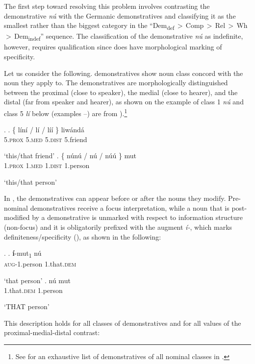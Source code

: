 The first step toward resolving this problem involves contrasting the demonstrative \textit{n\'u} with the Germanic demonstratives and classifying it as the smallest rather than the biggest category in the ``Dem\textsubscript{def}\,$>$\,Comp\,$>$\,Rel\,$>$\,Wh\,$>$\,Dem\textsubscript{indef}'' sequence. The classification of the demonstrative \textit{n\'u} as indefinite, however, requires qualification since  does have morphological marking of specificity.
\par
 Let us consider the following.  demonstratives show noun class concord with the noun they apply to. The demonstratives are morphologically distinguished between the proximal (close to speaker), the medial (close to hearer), and the distal (far from speaker and hearer), as shown on the example of class 1 \textit{n\'u} and class 5 \textit{l\'i} below (examples --) are from \citealt{Makasso2010}).\footnote{See \cite{Hyman2003} for an exhaustive list of demonstratives of all nominal classes in .
} %

\ex.\label{smierc} 
\ag. \{ l\'in\'i / l\'i / {l\'i\'i \}} liw\'and\'a \\
 {} 5.\textsc{prox} {} 5.\textsc{med} {} {5.\textsc{dist}} 5.friend\\
\strut `this/that friend'
\bg. \{ n\'un\'u / n\'u / {n\'u\'u \}} mut \\
 {} 1.\textsc{prox} {} 1.\textsc{med} {} {1.\textsc{dist}} 1.person\\
\strut `this/that person'

\noindent In , the demonstratives can appear before or after the nouns they modify. Pre-nominal demonstratives receive a focus interpretation, while a noun that is post-modified by a demonstrative is unmarked with respect to information structure (non-focus) and it is obligatorily prefixed with the augment \textit{\'i-}, which marks definiteness/specificity (\citealt{Jenks-etall}), as shown in the following: 

\ex.\label{Bas:i}
\ag.
\textbf{\'i}-mut\textsubscript{1} n\'u\\
\textsc{aug}-1.person 1.that.\textsc{dem}\\
\strut `that person' 
\bg.
n\'u mut\\
1.that.\textsc{dem} 1.person\\
\strut `THAT person'\label{B:unprefixednoun} 

\noindent
This description holds for all classes of demonstratives and for all values of the proximal-medial-distal contrast:

